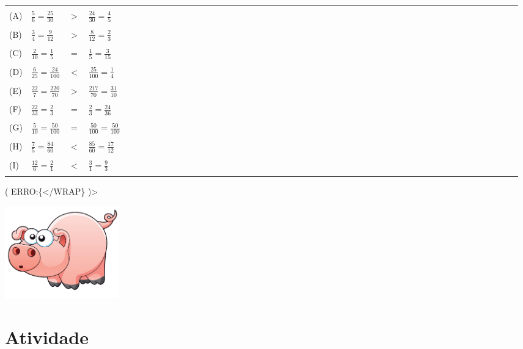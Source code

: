 \documentclass[a4,12pt]{book}
\begin{document}
\begin{center}
  \begin{tabulary}{0.8\textwidth}{*{50}{L}}
    \hline \hline \\
     (A) &  $\frac{5}{6} = \frac{25}{30}$ &   $>$  &  $\frac{24}{30} = \frac{4}{5}$ \\
    \hline \\
     (B) &  $\frac{3}{4} = \frac{9}{12}$ &   $>$  &  $\frac{8}{12} = \frac{2}{3}$ \\
    \hline \\
     (C) &  $\frac{2}{10} = \frac{1}{5}$ &   $=$  &  $\frac{1}{5} = \frac{3}{15}$ \\
    \hline \\
     (D) &  $\frac{6}{25} = \frac{24}{100}$ &   $<$  &  $\frac{25}{100} = \frac{1}{4}$ \\
    \hline \\
     (E) &  $\frac{22}{7} = \frac{220}{70}$ &   $>$  &  $\frac{217}{70} = \frac{31}{10}$ \\
    \hline \\
     (F) &  $\frac{22}{33} = \frac{2}{3}$ &   $=$  &  $\frac{2}{3} = \frac{24}{36}$ \\
    \hline \\
     (G) &  $\frac{5}{10} = \frac{50}{100}$ &   $=$  &  $\frac{50}{100} = \frac{50}{100}$ \\
    \hline \\
     (H) &  $\frac{7}{5} = \frac{84}{60}$ &   $<$  &  $\frac{85}{60} = \frac{17}{12}$ \\
    \hline \\
     (I) &  $\frac{12}{6} = \frac{2}{1}$ &   $<$  &  $\frac{3}{1} = \frac{9}{3}$ \\
    \hline \\
  \end{tabulary}
\end{center}
( ERRO:\{</WRAP\} )>


\includegraphics[width=\textwidth,height=4cm, keepaspectratio]{pig}
\section{Atividade}
\end{document}
